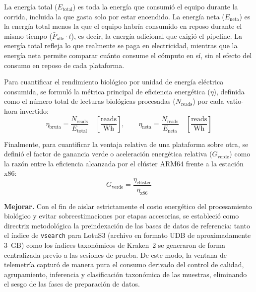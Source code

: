 \documentclass[12pt,oneside,spanish]{book}
\begin{document}
    La energía total ($E_{\text{total}}$) es toda la energía que consumió el equipo durante la corrida, incluida la que gasta solo por estar encendido. La energía neta ($E_{\text{neta}}$) es la energía total menos la que el equipo habría consumido en reposo durante el mismo tiempo ($\bar{P}_{\text{idle}} \cdot t$), es decir, la energía adicional que exigió el pipeline. La energía total refleja lo que realmente se paga en electricidad, mientras que la energía neta permite comparar cuánto consume el cómputo en sí, sin el efecto del consumo en reposo de cada plataforma.
    
    Para cuantificar el rendimiento biológico por unidad de energía eléctrica consumida, se formuló la métrica principal de eficiencia energética ($\eta$), definida como el número total de lecturas biológicas procesadas ($N_{\text{reads}}$) por cada vatio-hora invertido:
    \begin{equation}
        \eta_{\text{bruta}} = \frac{N_{\text{reads}}}{E_{\text{total}}} \quad \left[\frac{\text{reads}}{\text{Wh}}\right], \qquad \eta_{\text{neta}} = \frac{N_{\text{reads}}}{E_{\text{neta}}} \quad \left[\frac{\text{reads}}{\text{Wh}}\right]
        \label{eq:eficiencia}
    \end{equation}
    
    Finalmente, para cuantificar la ventaja relativa de una plataforma sobre otra, se definió el factor de ganancia verde o aceleración energética relativa ($G_{\text{verde}}$) como la razón entre la eficiencia alcanzada por el clúster ARM64 frente a la estación x86:
    \begin{equation}
        G_{\text{verde}} = \frac{\eta_{\text{clúster}}}{\eta_{\text{x86}}}
        \label{eq:ganancia_verde}
    \end{equation}
    
    \textbf{Mejorar.} Con el fin de aislar estrictamente el costo energético del procesamiento biológico y evitar sobreestimaciones por etapas accesorias, se estableció como directriz metodológica la preindexación de las bases de datos de referencia: tanto el índice de \texttt{vsearch} para LotuS3 (archivo en formato UDB de aproximadamente 3~GB) como los índices taxonómicos de Kraken~2 se generaron de forma centralizada previo a las sesiones de prueba. De este modo, la ventana de telemetría capturó de manera pura el consumo derivado del control de calidad, agrupamiento, inferencia y clasificación taxonómica de las muestras, eliminando el sesgo de las fases de preparación de datos.
    
\end{document}
